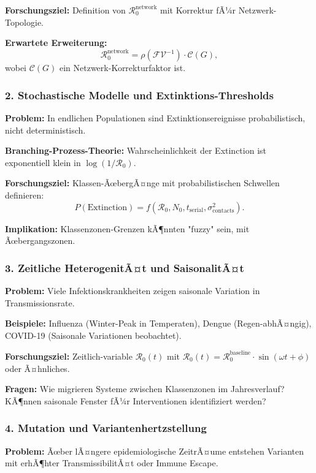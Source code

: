 ﻿\documentclass[a4paper,12pt,twoside]{article}
\theoremstyle{definition}
\begin{document}
\textbf{Forschungsziel:} Definition von $\mathcal{R}_0^{\text{network}}$ mit Korrektur fÃ¼r Netzwerk-Topologie.

\textbf{Erwartete Erweiterung:} 
\[
\mathcal{R}_0^{\text{network}} = \rho(\mathcal{F}\mathcal{V}^{-1}) \cdot \mathcal{C}(G),
\]
wobei $\mathcal{C}(G)$ ein Netzwerk-Korrekturfaktor ist.

\subsubsection{2. Stochastische Modelle und Extinktions-Thresholds}

\textbf{Problem:} In endlichen Populationen sind Extinktionsereignisse probabilistisch, nicht deterministisch.

\textbf{Branching-Prozess-Theorie:} Wahrscheinlichkeit der Extinction ist exponentiell klein in $\log(1/\mathcal{R}_0)$.

\textbf{Forschungsziel:} Klassen-ÃœbergÃ¤nge mit probabilistischen Schwellen definieren:
\[
P(\text{Extinction}) = f(\mathcal{R}_0, N_0, t_{\text{serial}}, \sigma^2_{\text{contacts}}).
\]

\textbf{Implikation:} Klassenzonen-Grenzen kÃ¶nnten "fuzzy" sein, mit Ãœbergangszonen.

\subsubsection{3. Zeitliche HeterogenitÃ¤t und SaisonalitÃ¤t}

\textbf{Problem:} Viele Infektionskrankheiten zeigen saisonale Variation in Transmissionsrate.

\textbf{Beispiele:} Influenza (Winter-Peak in Temperaten), Dengue (Regen-abhÃ¤ngig), COVID-19 (Saisonale Variationen beobachtet).

\textbf{Forschungsziel:} Zeitlich-variable $\mathcal{R}_0(t)$ mit $\mathcal{R}_0(t) = \mathcal{R}_0^{\text{baseline}} \cdot \sin(\omega t + \phi)$ oder Ã¤hnliches.

\textbf{Fragen:} Wie migrieren Systeme zwischen Klassenzonen im Jahresverlauf? KÃ¶nnen saisonale Fenster fÃ¼r Interventionen identifiziert werden?

\subsubsection{4. Mutation und Variantenhertzstellung}

\textbf{Problem:} Ãœber lÃ¤ngere epidemiologische ZeitrÃ¤ume entstehen Varianten mit erhÃ¶hter TransmissibilitÃ¤t oder Immune Escape.
\end{document}
